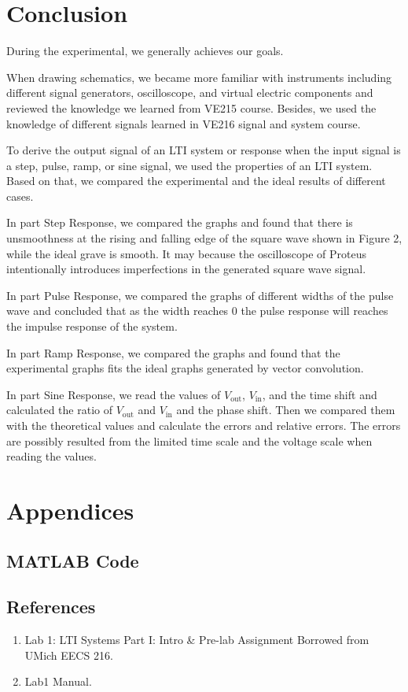 \documentclass[a4paper]{article}
\begin{document}
\section{Conclusion}
During the experimental, we generally achieves our goals.

When drawing schematics, we became more familiar with instruments including different signal generators, oscilloscope, and virtual electric components and reviewed the knowledge we learned from VE215 course. Besides, we used the knowledge of different signals learned in VE216 signal and system course.

To derive the output signal of an LTI system or response when the input signal is a step, pulse, ramp, or sine signal, we used the properties of an LTI system. Based on that, we compared the experimental and the ideal results of different cases.

In part Step Response, we compared the graphs and found that there is unsmoothness at the rising and falling edge of the square wave shown in Figure 2, while the ideal grave is smooth. It may because the oscilloscope of Proteus intentionally introduces imperfections in the generated square wave signal.

In part Pulse Response, we compared the graphs of different widths of the pulse wave and concluded that as the width reaches 0 the pulse response will reaches the impulse response of the system.

In part Ramp Response, we compared the graphs and found that the experimental graphs fits the ideal graphs generated by vector convolution.

In part Sine Response, we read the values of $V_\text{out}$, $V_\text{in}$, and the time shift and calculated the ratio of $V_\text{out}$ and $V_\text{in}$ and the phase shift. Then we compared them with the theoretical values and calculate the errors and relative errors. The errors are possibly resulted from the limited time scale and the voltage scale when reading the values.
\section{Appendices}
\subsection{MATLAB Code}

\subsection{References}
\begin{enumerate}
	\item Lab 1: LTI Systems Part I: Intro \& Pre-lab Assignment Borrowed from UMich EECS 216.
	\item Lab1 Manual.
\end{enumerate}
\end{document}
